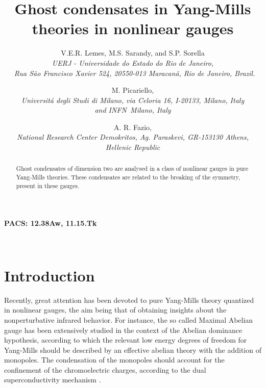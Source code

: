 \documentclass[a4paper,12pt]{article}
\begin{document}
\title{\textbf{Ghost condensates in Yang-Mills theories in nonlinear gauges } }
\author{V.E.R. Lemes, M.S. Sarandy, and S.P. Sorella \\
{\small {\textit{UERJ - Universidade do Estado do Rio de Janeiro,}}} \\
{\small {\textit{\ Rua S\~{a}o Francisco Xavier 524, 20550-013 Maracan\~{a}, 
}}} {\small {\textit{Rio de Janeiro, Brazil.}}} \and M. Picariello, \\
{\small {\textit{Universit\'{a} degli Studi di Milano, via Celoria 16,
I-20133, Milano, Italy }}}\\
{\small {\textit{and INFN\ Milano, Italy}}} \and A. R. Fazio, \\
{\small {\textit{National Research Center Demokritos, Ag. Paraskevi,
GR-153130 Athens, }}}\\
{\small {\textit{Hellenic Republic }}}}
\maketitle

\vspace{0.5cm}
{\centerline {\bf PACS: 12.38Aw, 11.15.Tk} }
\vspace{0.5cm}


\begin{abstract}
Ghost condensates of dimension two are analysed in a class of nonlinear
gauges in pure Yang-Mills theories. These condensates are related to the
breaking of the \coordHE{} symmetry, present in these gauges. %
\end{abstract}

\vfill\newpage\ \makeatother

\renewcommand{\theequation}{\thesection.\arabic{equation}}

\section{Introduction}

Recently, great attention has been devoted to pure Yang-Mills theory
quantized in nonlinear gauges, the aim being that of obtaining insights
about the nonperturbative infrared behavior. For instance, the so called
Maximal Abelian gauge \cite{th,kr} has been extensively studied in the
context of the Abelian dominance hypothesis, according to which the relevant
low energy degrees of freedom for Yang-Mills should be described by an
effective abelian theory with the addition of monopoles. The condensation of
the monopoles should account for the confinement of the chromoelectric
charges, according to the dual superconductivity mechanism \cite{th,scon}.
\end{document}
